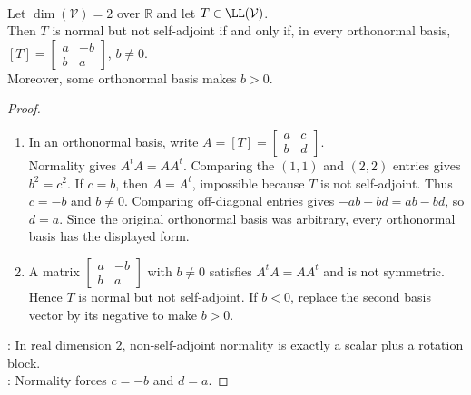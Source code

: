 \begin{proposition} \label{prop:two-dimensional-real-normal-block} \\
Let $\dim(\mathcal{V})=2$ over $\mathbb{R}$ and let $T\in\LL(\mathcal{V})$.\\
Then $T$ is normal but not self-adjoint if and only if, in every orthonormal basis, $[T]=
\begin{bmatrix}
a&-b\\
b&a
\end{bmatrix}$, $b\neq0$.\\
Moreover, some orthonormal basis makes $b>0$.
\begin{proof}
\begin{enumerate}[label=\roman*.]
\setlength{\itemsep}{0pt}
\item[$(\Rightarrow)$] In an orthonormal basis, write $A=[T]=
\begin{bmatrix}
a&c\\
b&d
\end{bmatrix}$.\\
Normality gives $A^tA=AA^t$. Comparing the $(1,1)$ and $(2,2)$ entries gives $b^2=c^2$. If $c=b$, then $A=A^t$, impossible because $T$ is not self-adjoint. Thus $c=-b$ and $b\neq0$. Comparing off-diagonal entries gives $-ab+bd=ab-bd$, so $d=a$. Since the original orthonormal basis was arbitrary, every orthonormal basis has the displayed form.
\item[$(\Leftarrow)$] A matrix $\begin{bmatrix}a&-b\\ b&a\end{bmatrix}$ with $b\neq0$ satisfies $A^tA=AA^t$ and is not symmetric. Hence $T$ is normal but not self-adjoint. If $b<0$, replace the second basis vector by its negative to make $b>0$.
\end{enumerate}
: In real dimension $2$, non-self-adjoint normality is exactly a scalar plus a rotation block.\\
: Normality forces $c=-b$ and $d=a$.
\end{proof}
\end{proposition}

